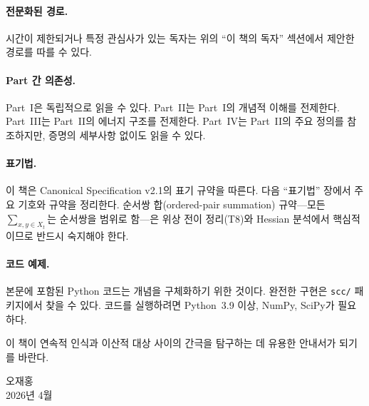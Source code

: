 \paragraph{전문화된 경로.}
시간이 제한되거나 특정 관심사가 있는 독자는 위의 ``이 책의 독자'' 섹션에서 제안한 경로를 따를 수 있다.

\paragraph{Part 간 의존성.}
Part~I은 독립적으로 읽을 수 있다. Part~II는 Part~I의 개념적 이해를 전제한다. Part~III는 Part~II의 에너지 구조를 전제한다. Part~IV는 Part~II의 주요 정의를 참조하지만, 증명의 세부사항 없이도 읽을 수 있다.

\paragraph{표기법.}
이 책은 Canonical Specification v2.1의 표기 규약을 따른다. 다음 ``표기법'' 장에서 주요 기호와 규약을 정리한다. 순서쌍 합(ordered-pair summation) 규약---모든 $\sum_{x,y \in X_t}$는 순서쌍을 범위로 함---은 위상 전이 정리(T8)와 Hessian 분석에서 핵심적이므로 반드시 숙지해야 한다.

\paragraph{코드 예제.}
본문에 포함된 Python 코드는 개념을 구체화하기 위한 것이다. 완전한 구현은 \texttt{scc/} 패키지에서 찾을 수 있다. 코드를 실행하려면 Python~3.9 이상, NumPy, SciPy가 필요하다.

\bigskip
\noindent
이 책이 연속적 인식과 이산적 대상 사이의 간극을 탐구하는 데 유용한 안내서가 되기를 바란다.

\vspace{1cm}
\begin{flushright}
오재홍\\
2026년 4월
\end{flushright}
